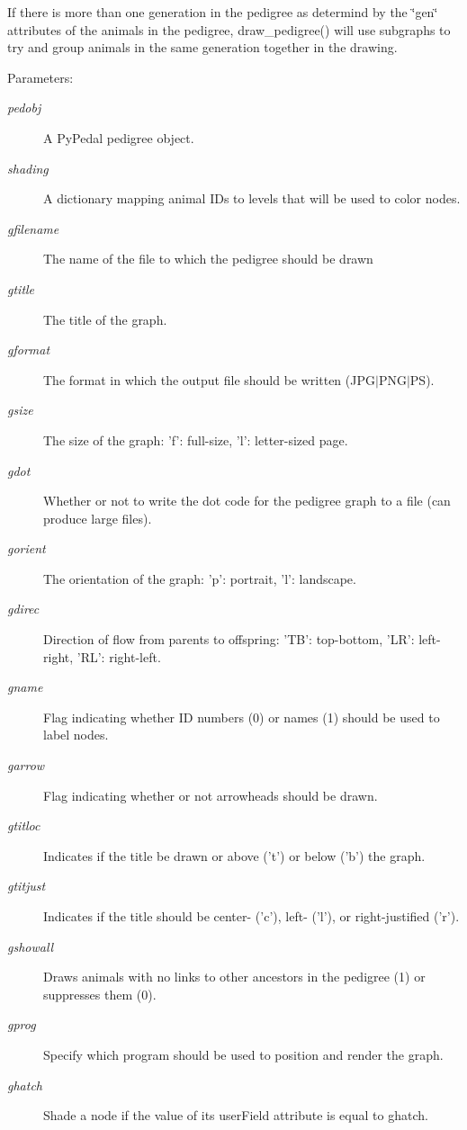 If there is more than one generation in the pedigree as determind by the \char`\"{}gen\char`\"{} attributes of the animals in the pedigree, draw\_\-pedigree() will use subgraphs to try and group animals in the same generation together in the drawing. \begin{Desc}
\item[Parameters:]
\begin{description}
\item[{\em pedobj}]A Py\-Pedal pedigree object. \item[{\em shading}]A dictionary mapping animal IDs to levels that will be used to color nodes. \item[{\em gfilename}]The name of the file to which the pedigree should be drawn \item[{\em gtitle}]The title of the graph. \item[{\em gformat}]The format in which the output file should be written (JPG$|$PNG$|$PS). \item[{\em gsize}]The size of the graph: 'f': full-size, 'l': letter-sized page. \item[{\em gdot}]Whether or not to write the dot code for the pedigree graph to a file (can produce large files). \item[{\em gorient}]The orientation of the graph: 'p': portrait, 'l': landscape. \item[{\em gdirec}]Direction of flow from parents to offspring: 'TB': top-bottom, 'LR': left-right, 'RL': right-left. \item[{\em gname}]Flag indicating whether ID numbers (0) or names (1) should be used to label nodes. \item[{\em garrow}]Flag indicating whether or not arrowheads should be drawn. \item[{\em gtitloc}]Indicates if the title be drawn or above ('t') or below ('b') the graph. \item[{\em gtitjust}]Indicates if the title should be center- ('c'), left- ('l'), or right-justified ('r'). \item[{\em gshowall}]Draws animals with no links to other ancestors in the pedigree (1) or suppresses them (0). \item[{\em gprog}]Specify which program should be used to position and render the graph. \item[{\em ghatch}]Shade a node if the value of its user\-Field attribute is equal to ghatch. \end{description}
\end{Desc}

